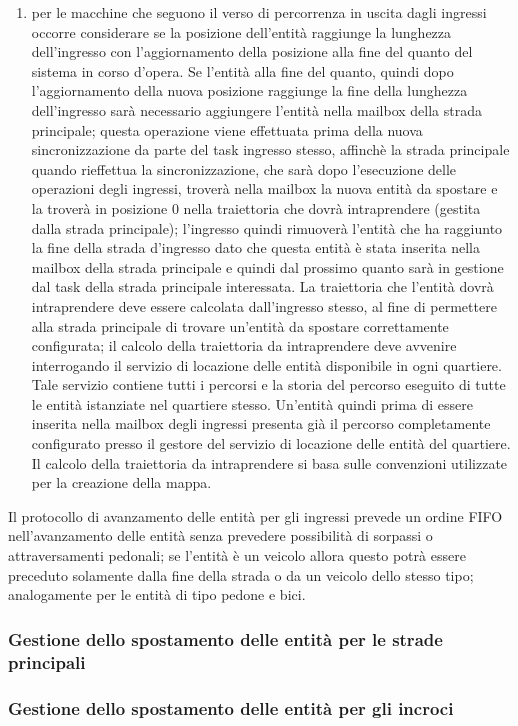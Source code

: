 \begin{enumerate}
\item per le macchine che seguono il verso di percorrenza in uscita dagli ingressi occorre considerare se la posizione dell'entità raggiunge la lunghezza dell'ingresso con l'aggiornamento della posizione alla fine del quanto del sistema in corso d'opera. Se l'entità alla fine del quanto, quindi dopo l'aggiornamento della nuova posizione raggiunge la fine della lunghezza dell'ingresso sarà necessario aggiungere l'entità nella mailbox della strada principale; questa operazione viene effettuata prima della nuova sincronizzazione da parte del task ingresso stesso, affinchè la strada principale quando rieffettua la sincronizzazione, che sarà dopo l'esecuzione delle operazioni degli ingressi, troverà nella mailbox la nuova entità da spostare e la troverà in posizione 0 nella traiettoria che dovrà intraprendere (gestita dalla strada principale); l'ingresso quindi rimuoverà l'entità che ha raggiunto la fine della strada d'ingresso dato che questa entità è stata inserita nella mailbox della strada principale e quindi dal prossimo quanto sarà in gestione dal task della strada principale interessata. La traiettoria che l'entità dovrà intraprendere deve essere calcolata dall'ingresso stesso, al fine di permettere alla strada principale di trovare un'entità da spostare correttamente configurata; il calcolo della traiettoria da intraprendere deve avvenire interrogando il servizio di locazione delle entità disponibile in ogni quartiere. Tale servizio contiene tutti i percorsi e la storia del percorso eseguito di tutte le entità istanziate nel quartiere stesso. Un'entità quindi prima di essere inserita nella mailbox degli ingressi presenta già il percorso completamente configurato presso il gestore del servizio di locazione delle entità del quartiere. Il calcolo della traiettoria da intraprendere si basa sulle convenzioni utilizzate per la creazione della mappa.
\end{enumerate}
Il protocollo di avanzamento delle entità per gli ingressi prevede un ordine FIFO nell'avanzamento delle entità senza prevedere possibilità di sorpassi o attraversamenti pedonali; se l'entità è un veicolo allora questo potrà essere preceduto solamente dalla fine della strada o da un veicolo dello stesso tipo; analogamente per le entità di tipo pedone e bici. 

\subsubsection{Gestione dello spostamento delle entità per le strade principali}
\subsubsection{Gestione dello spostamento delle entità per gli incroci}
